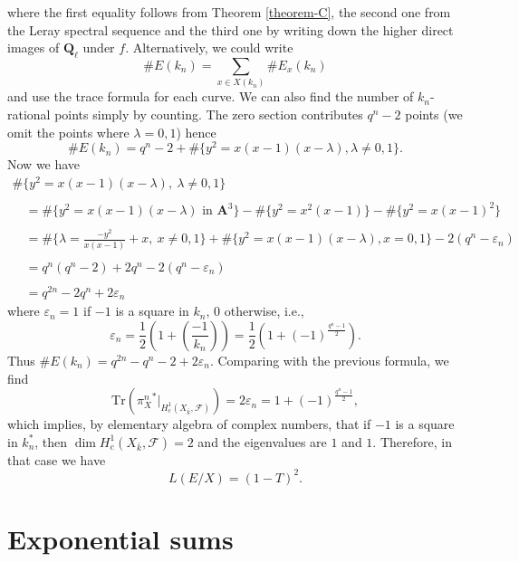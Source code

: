 where the first equality follows from
Theorem \ref{theorem-C},
the second one from
the Leray spectral sequence and the third one by writing down the higher direct
images of $\mathbf{Q}_\ell$ under $f$. Alternatively, we could write
$$
\# E(k_n) = \sum_{x \in X(k_n)} \# E_x(k_n)
$$
and use the trace formula for each curve. We can also find the number of
$k_n$-rational points simply by counting. The zero section contributes $q^n -2$
points (we omit the points where $\lambda = 0, 1$) hence
$$
\# E(k_n) =
q^n - 2 + \# \{y^2 = x(x - 1)(x - \lambda), \lambda\neq 0, 1\}.
$$
Now we have
$$
\begin{matrix}
\# \{y^2 = x(x - 1)(x - \lambda),\ \lambda\neq 0, 1\} \\
\\
\quad =
\# \{y^2 = x(x - 1)(x - \lambda)\text{ in }\mathbf{A}^3\}
- \# \{y^2 = x^2(x - 1)\} - \# \{y^2 = x(x - 1)^2\}\\
\\
\quad = \# \{\lambda = \frac{-y^2}{x(x - 1)} + x,\ x\neq 0, 1\} +
\# \{y^2 = x(x - 1)(x - \lambda), x = 0, 1\} - 2(q^n - \varepsilon_n) \\
\\
\quad = q^n(q^n - 2)+2q^n - 2(q^n - \varepsilon_n)\\
\\
\quad = q^{2n}-2q^n+2\varepsilon_n
\end{matrix}
$$
where $\varepsilon_n = 1$ if $-1$ is a square in $k_n$, 0 otherwise,
i.e.,
$$
\varepsilon_n = \frac{1}{2}\left(1+\left(\frac{-1}{k_n}\right)\right) =
\frac{1}{2}\left(1+(-1)^{\frac{q^n - 1}{2}}\right).
$$
Thus $ \# E(k_n) = q^{2n} - q^n - 2+ 2\varepsilon_n$.
Comparing with the previous formula, we find
$$
\text{Tr}({\pi_X^n}^* |_{H_c^1(X_{\bar k}, \mathcal{F})}) =
2 \varepsilon_n = 1 + (-1)^{\frac{q^n - 1}{2}},
$$
which implies, by elementary algebra of complex numbers, that if $-1$ is a
square in $k_n^*$, then $\dim H_c^1(X_{\bar k}, \mathcal{F}) = 2$ and the
eigenvalues are $1$ and $1$. Therefore, in that case we have
$$
L(E/X) = (1 - T)^2.
$$




\section{Exponential sums}
\label{section-exponential-sums}

